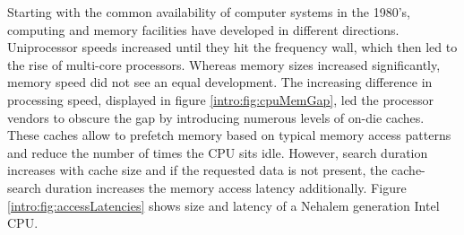 Starting with the common availability of computer systems in the 1980's,
computing and memory facilities have developed in different directions.
Uniprocessor speeds increased until they hit the frequency wall, which then led
to the rise of multi-core processors.
Whereas memory sizes increased significantly, memory speed did not see an
equal development.
The increasing difference in processing speed, displayed in figure
\ref{intro:fig:cpuMemGap}, led the processor vendors to obscure the gap by
introducing numerous levels of on-die caches.
These caches allow to prefetch memory based on typical memory access patterns
and reduce the number of times the CPU sits idle.
However, search duration increases with cache size and if the requested data is
not present, the cache-search duration increases the memory access latency additionally.
Figure \ref{intro:fig:accessLatencies} shows size and latency of a Nehalem
generation Intel CPU.

